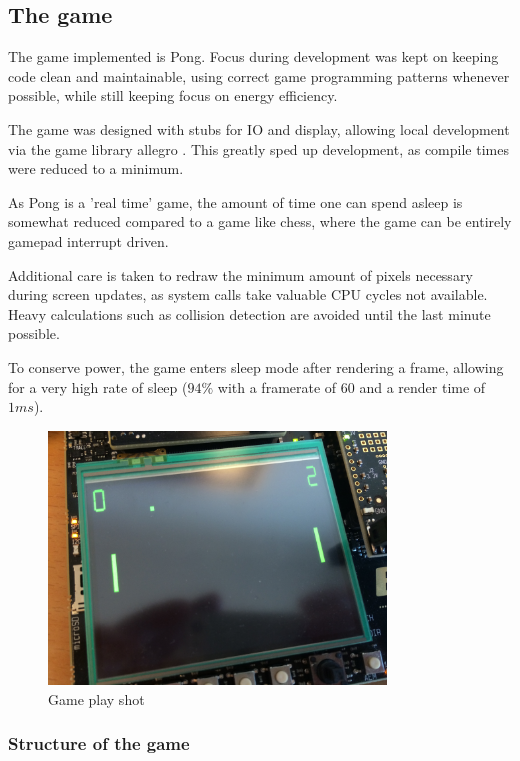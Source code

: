 \subsection{The game}

The game implemented is Pong. Focus during development was kept on keeping code
clean and maintainable, using correct game programming patterns whenever
possible, while still keeping focus on energy efficiency.

The game was designed with stubs for IO and display,
allowing local development via the game library allegro \cite{allegro}.
This greatly sped up development, as compile times were reduced to a minimum.

As Pong is a 'real time' game, the amount of time one can spend asleep is
somewhat reduced compared to a game like chess,
where the game can be entirely gamepad interrupt driven.

Additional care is taken to redraw the minimum amount of pixels necessary
during screen updates, as system calls take valuable CPU cycles not available.
Heavy calculations such as collision detection are avoided until the last
minute possible.

To conserve power, the game enters sleep mode after rendering a frame,
allowing for a very high rate of sleep
($ 94\% $ with a framerate of $ 60 $ and a render time of $ 1 ms $).

\begin{figure}[H]
\centering
\includegraphics[width=0.8\textwidth]{figures/gameplay.jpg}
\caption{Game play shot}

\end{figure}

\subsubsection{Structure of the game}

